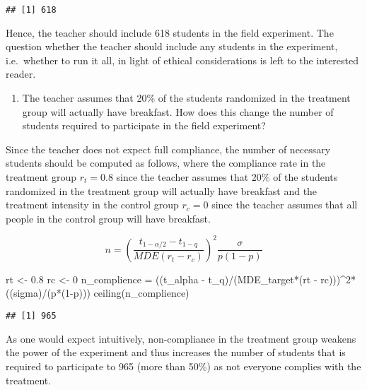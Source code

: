 \documentclass[
]{article}
\newenvironment{Shaded}{\begin{snugshade}}{\end{snugshade}}
\newcommand{\DecValTok}[1]{\textcolor[rgb]{0.00,0.00,0.81}{#1}}
\newcommand{\FloatTok}[1]{\textcolor[rgb]{0.00,0.00,0.81}{#1}}
\newcommand{\FunctionTok}[1]{\textcolor[rgb]{0.00,0.00,0.00}{#1}}
\newcommand{\NormalTok}[1]{#1}
\newcommand{\OtherTok}[1]{\textcolor[rgb]{0.56,0.35,0.01}{#1}}
\newcommand{\SpecialCharTok}[1]{\textcolor[rgb]{0.00,0.00,0.00}{#1}}
\providecommand{\tightlist}{%
  \setlength{\itemsep}{0pt}\setlength{\parskip}{0pt}}
\begin{document}
\begin{verbatim}
## [1] 618
\end{verbatim}

Hence, the teacher should include 618 students in the field experiment.
The question whether the teacher should include any students in the
experiment, i.e.~whether to run it all, in light of ethical
considerations is left to the interested reader.

\begin{enumerate}
\def\labelenumi{\alph{enumi})}
\setcounter{enumi}{1}
\tightlist
\item
  The teacher assumes that 20\% of the students randomized in the
  treatment group will actually have breakfast. How does this change the
  number of students required to participate in the field experiment?
\end{enumerate}

Since the teacher does not expect full compliance, the number of
necessary students should be computed as follows, where the compliance
rate in the treatment group \(r_t=0.8\) since the teacher assumes that
20\% of the students randomized in the treatment group will actually
have breakfast and the treatment intensity in the control group
\(r_c=0\) since the teacher assumes that all people in the control group
will have breakfast.

\[
n=\left(\frac{t_{1-\alpha/2}-t_{1-q}}{MDE(r_t-r_c)}\right)^2\frac{\sigma}{p(1-p)}
\]

\begin{Shaded}
\begin{Highlighting}[]
\NormalTok{rt }\OtherTok{\textless{}{-}} \FloatTok{0.8}
\NormalTok{rc }\OtherTok{\textless{}{-}} \DecValTok{0}
\NormalTok{n\_complience }\OtherTok{=}\NormalTok{ ((t\_alpha }\SpecialCharTok{{-}}\NormalTok{ t\_q)}\SpecialCharTok{/}\NormalTok{(MDE\_target}\SpecialCharTok{*}\NormalTok{(rt }\SpecialCharTok{{-}}\NormalTok{ rc)))}\SpecialCharTok{\^{}}\DecValTok{2}\SpecialCharTok{*}\NormalTok{((sigma)}\SpecialCharTok{/}\NormalTok{(p}\SpecialCharTok{*}\NormalTok{(}\DecValTok{1}\SpecialCharTok{{-}}\NormalTok{p)))}
\FunctionTok{ceiling}\NormalTok{(n\_complience)}
\end{Highlighting}
\end{Shaded}

\begin{verbatim}
## [1] 965
\end{verbatim}

As one would expect intuitively, non-compliance in the treatment group
weakens the power of the experiment and thus increases the number of
students that is required to participate to 965 (more than 50\%) as not
everyone complies with the treatment.
\end{document}
